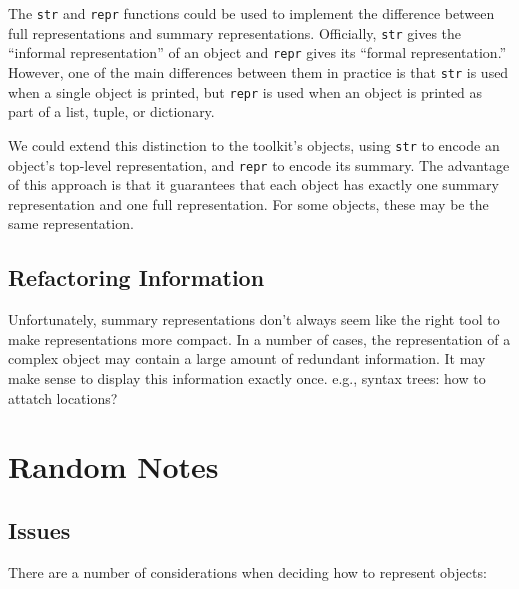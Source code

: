 \documentclass[11pt]{article}
\begin{document}
  The \texttt{str} and \texttt{repr} functions could be used to
  implement the difference between full representations and summary
  representations.  Officially, \texttt{str} gives the ``informal
  representation'' of an object and \texttt{repr} gives its ``formal
  representation.''  However, one of the main differences between them
  in practice is that \texttt{str} is used when a single object is
  printed, but \texttt{repr} is used when an object is printed as part
  of a list, tuple, or dictionary.  

  We could extend this distinction to the toolkit's objects, using
  \texttt{str} to encode an object's top-level representation, and
  \texttt{repr} to encode its summary.  The advantage of this approach
  is that it guarantees that each object has exactly one summary
  representation and one full representation.  For some objects, these
  may be the same representation.

\subsection{Refactoring Information}

  Unfortunately, summary representations don't always seem like the
  right tool to make representations more compact.  In a number of
  cases, the representation of a complex object may contain a large
  amount of redundant information.  It may make sense to display this
  information exactly once.  e.g., syntax trees: how to attatch
  locations?

\section{Random Notes}

\subsection{Issues}

There are a number of considerations when deciding how to represent
objects:
\end{document}

